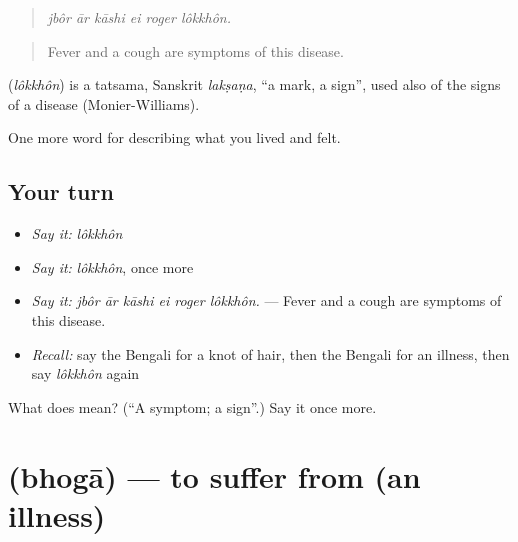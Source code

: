 \begin{quote}
     
\end{quote}

\begin{quote}
\emph{jbôr ār kāshi ei roger lôkkhôn.}
\end{quote}

\begin{quote}
Fever and a cough are symptoms of this disease.
\end{quote}

\begin{cousinweb}
\textbf{} (\emph{lôkkhôn}) is a tatsama, Sanskrit \emph{lakṣaṇa}, \textquotedblleft{}a mark, a sign\textquotedblright{}, used also of the signs of a disease (Monier-Williams).
\end{cousinweb}

\begin{grammarlens}[title={What you've built}]
One more word for describing what you lived and felt.
\end{grammarlens}

\subsection*{Your turn}
\begin{itemize}
\raggedright
  \item \emph{Say it:} \emph{lôkkhôn}
  \item \emph{Say it:} \emph{lôkkhôn}, once more
  \item \emph{Say it:} \emph{jbôr ār kāshi ei roger lôkkhôn.} — Fever and a cough are symptoms of this disease.
  \item \emph{Recall:} say the Bengali for a knot of hair, then the Bengali for an illness, then say \emph{lôkkhôn} again
\end{itemize}

\begin{tcolorbox}[breakable,colback=teal!4,colframe=teal!35!black,title={Before you move on}]
What does  mean? (\textquotedblleft{}A symptom; a sign\textquotedblright{}.) Say it once more.
\end{tcolorbox}
\section[\texorpdfstring{\bn{ভোগা} (bhogā)}{ভোগা (bhogā)}]{ (bhogā) — to suffer from (an illness)}

